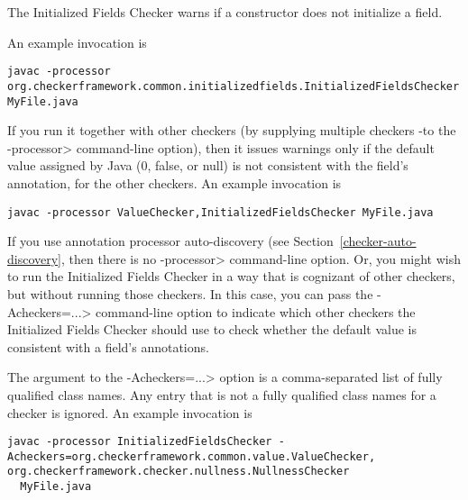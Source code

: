 \htmlhr
{}

The Initialized Fields Checker warns if a constructor does not initialize a
field.



An example invocation is

\begin{Verbatim}
javac -processor org.checkerframework.common.initializedfields.InitializedFieldsChecker MyFile.java
\end{Verbatim}

If you run it together with other checkers (by supplying multiple checkers
-to the \<-processor> command-line option), then it issues warnings only if
the default value assigned by Java (0, false, or null) is not consistent
with the field's annotation, for the other checkers.
An example invocation is

\begin{Verbatim}
javac -processor ValueChecker,InitializedFieldsChecker MyFile.java
\end{Verbatim}


If you use annotation processor auto-discovery (see
Section~\ref{checker-auto-discovery}, then there is no \<-processor>
command-line option.  Or, you might wish to run the Initialized Fields
Checker in a way that is cognizant of other checkers, but without running
those checkers.  In this case, you can pass the \<-Acheckers=...>
command-line option to indicate which other checkers the Initialized Fields
Checker should use to check whether the default value is consistent with a
field's annotations.

The argument to the \<-Acheckers=...> option is a comma-separated list of
fully qualified class names.  Any entry that is not a fully qualified class
names for a checker is ignored.
An example invocation is

\begin{Verbatim}
javac -processor InitializedFieldsChecker -Acheckers=org.checkerframework.common.value.ValueChecker,  org.checkerframework.checker.nullness.NullnessChecker
  MyFile.java
\end{Verbatim}


